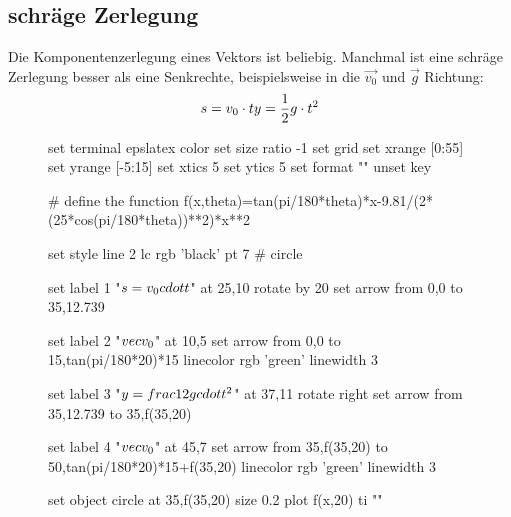 \subsection{schr\"age Zerlegung}
Die Komponentenzerlegung eines Vektors ist beliebig. Manchmal ist eine schr\"age Zerlegung besser als eine Senkrechte,
beispielsweise in die $\vec{v_0}$ und $\vec{g}$ Richtung:
\newline
\[
	s=v_0 \cdot t \\
	y=\frac{1}{2}g \cdot t^2
\]
\begin{figure}[htbp]
\centering
\begin{gnuplot}[scale=0.75]
	set terminal epslatex color
	set size ratio -1
	set grid
  set xrange [0:55]
	set yrange [-5:15]
	set xtics 5
	set ytics 5
	set format ""
	unset key

  # define the function
  f(x,theta)=tan(pi/180*theta)*x-9.81/(2*(25*cos(pi/180*theta))**2)*x**2

	set style line 2 lc rgb 'black' pt 7   # circle
	
	set label 1 "$s=v_0 \\cdot t$" at 25,10 rotate by 20
	set arrow from 0,0 to 35,12.739
	
	set label 2 "$\\vec{v_0}$" at 10,5
	set arrow from 0,0 to 15,tan(pi/180*20)*15 linecolor rgb 'green' linewidth 3
	
	set label 3 "$y=\\frac{1}{2}g \\cdot t^2$" at 37,11 rotate right
	set arrow from 35,12.739 to 35,f(35,20)
	
	set label 4 "$\\vec{v_0}$" at 45,7
	set arrow from 35,f(35,20) to 50,tan(pi/180*20)*15+f(35,20) linecolor rgb 'green' linewidth 3
	
	set object circle at 35,f(35,20) size 0.2
  plot f(x,20) ti ""
	\end{gnuplot}
\end{figure}